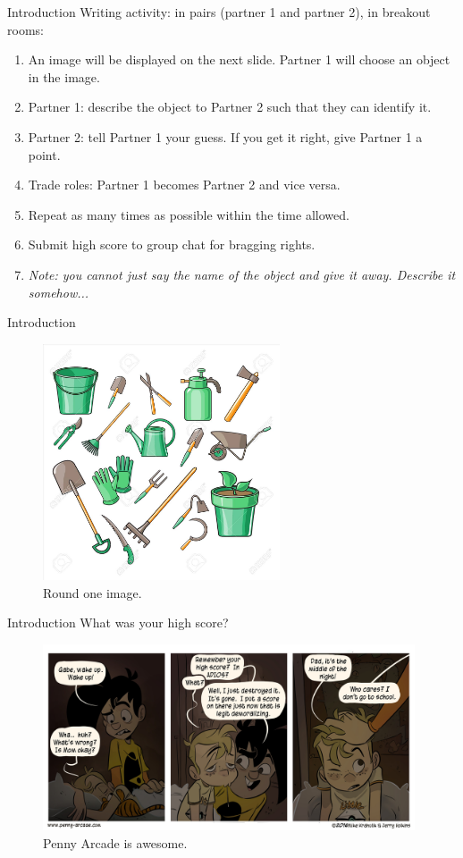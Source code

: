 \documentclass{beamer}
\begin{document}
\begin{frame}{Introduction}
Writing activity: in pairs (partner 1 and partner 2), in breakout rooms:
\begin{enumerate}
\item An image will be displayed on the next slide.  Partner 1 will choose an object in the image.
\item Partner 1: describe the object to Partner 2 such that they can identify it.
\item Partner 2: tell Partner 1 your guess.  If you get it right, give Partner 1 a point.
\item Trade roles: Partner 1 becomes Partner 2 and vice versa.
\item Repeat as many times as possible within the time allowed.
\item Submit high score to group chat for bragging rights.
\item \textit{Note: you cannot just say the name of the object and give it away.  Describe it somehow...}
\end{enumerate}
\end{frame}

\begin{frame}{Introduction}
\begin{figure}
\includegraphics[width=7cm]{figures/garden1.jpg}
\caption{\label{fig:garden1} Round one image.}
\end{figure}
\end{frame}

\begin{frame}{Introduction}
What was your high score?
\begin{figure}
\includegraphics[width=11cm]{figures/funny.jpg}
\caption{\label{fig:funny} Penny Arcade is awesome.}
\end{figure}
\end{frame}
\end{document}
